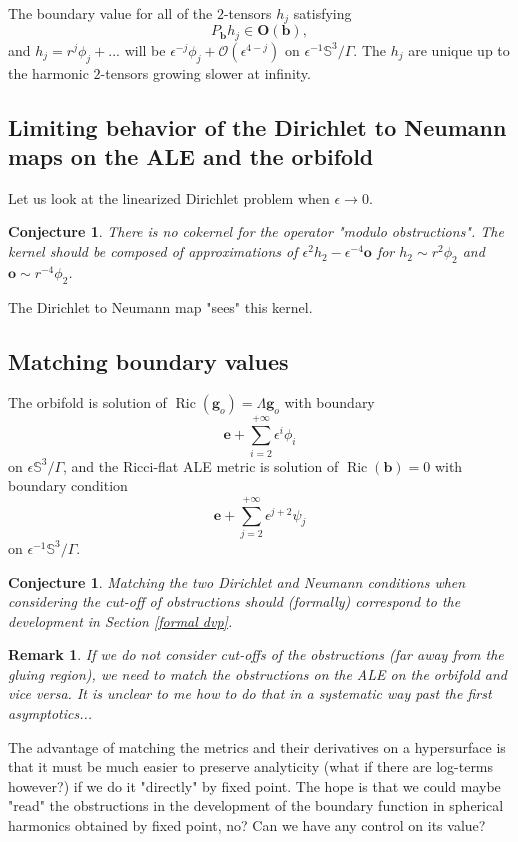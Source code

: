 \documentclass[12pt]{article}
\newtheorem{conj}[thm]{Conjecture}
\newtheorem{rem}[thm]{Remark}
\DeclareMathOperator{\Ric}{\operatorname{Ric}}
\begin{document}
   The boundary value for all of the $2$-tensors $h_j$ satisfying
   $$ P_{\mathbf{b}} h_j \in \mathbf{O}(\mathbf{b}), $$
   and $h_j = r^j\phi_j + ...$ will be $\epsilon^{-j}\phi_j +\mathcal{O}(\epsilon^{4-j})$ on $\epsilon^{-1}\mathbb{S}^3\slash\Gamma$. The $h_j$ are unique up to the harmonic $2$-tensors growing slower at infinity.
   
   
   
   \subsection{Limiting behavior of the Dirichlet to Neumann maps on the ALE and the orbifold}
   
   Let us look at the linearized Dirichlet problem when $\epsilon\to 0$. 
   \begin{conj}
        There is no cokernel for the operator "modulo obstructions". The kernel should be composed of approximations of $ \epsilon^2 h_2 - \epsilon^{-4}\mathbf{o} $ for $h_2 \sim r^2\phi_2$ and $\mathbf{o}\sim r^{-4}\phi_2$.
   \end{conj}
   
   The Dirichlet to Neumann map "sees" this kernel.
   
   
   
   \subsection{Matching boundary values}
   
   The orbifold is solution of $\Ric(\mathbf{g}_o) = \Lambda \mathbf{g}_o$ with boundary $$\mathbf{e} + \sum_{i=2}^{+\infty} \epsilon^{i}\phi_i$$ on $\epsilon \mathbb{S}^3\slash\Gamma$, and the Ricci-flat ALE metric is solution of $\Ric(\mathbf{b}) = 0$ with boundary condition $$\mathbf{e} + \sum_{j=2}^{+\infty} \epsilon^{j+2}\psi_j$$
   on $\epsilon^{-1} \mathbb{S}^3\slash\Gamma$.
   
   \begin{conj}
        Matching the two Dirichlet and Neumann conditions when considering the cut-off of obstructions should (formally) correspond to the development in Section \ref{formal dvp}.
   \end{conj}
   \begin{rem}
        If we do not consider cut-offs of the obstructions (far away from the gluing region), we need to match the obstructions on the ALE on the orbifold and vice versa. It is unclear to me how to do that in a systematic way past the first asymptotics...
   \end{rem}
    The advantage of matching the metrics and their derivatives on a hypersurface is that it must be much easier to preserve analyticity (what if there are log-terms however?) if we do it "directly" by fixed point. The hope is that we could maybe "read" the obstructions in the development of the boundary function in spherical harmonics obtained by fixed point, no? Can we have any control on its value?
   
\end{document}

